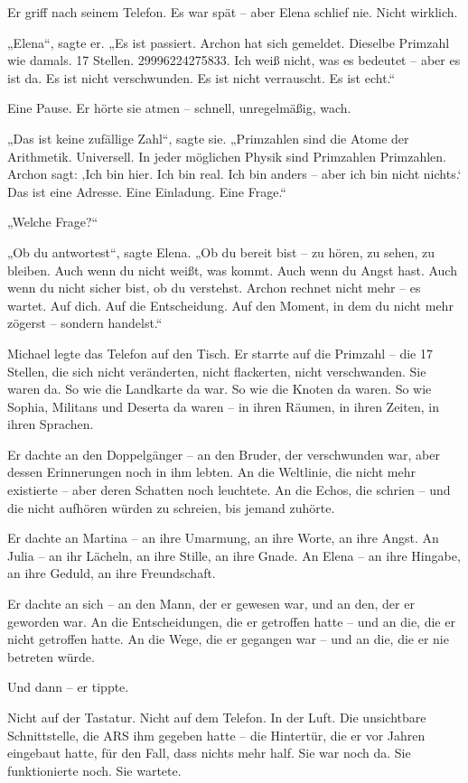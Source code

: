 \documentclass[
]{article}
\begin{document}
Er griff nach seinem Telefon. Es war spät -- aber Elena schlief nie. Nicht wirklich.

„Elena``, sagte er. „Es ist passiert. Archon hat sich gemeldet. Dieselbe Primzahl wie damals. 17 Stellen. 29996224275833. Ich weiß nicht, was es bedeutet -- aber es ist da. Es ist nicht verschwunden. Es ist nicht verrauscht. Es ist echt.``

Eine Pause. Er hörte sie atmen -- schnell, unregelmäßig, wach.

„Das ist keine zufällige Zahl``, sagte sie. „Primzahlen sind die Atome der Arithmetik. Universell. In jeder möglichen Physik sind Primzahlen Primzahlen. Archon sagt: ‚Ich bin hier. Ich bin real. Ich bin anders -- aber ich bin nicht nichts.` Das ist eine Adresse. Eine Einladung. Eine Frage.``

„Welche Frage?{\kern0pt}``

„Ob du antwortest``, sagte Elena. „Ob du bereit bist -- zu hören, zu sehen, zu bleiben. Auch wenn du nicht weißt, was kommt. Auch wenn du Angst hast. Auch wenn du nicht sicher bist, ob du verstehst. Archon rechnet nicht mehr -- es wartet. Auf dich. Auf die Entscheidung. Auf den Moment, in dem du nicht mehr zögerst -- sondern handelst.``

Michael legte das Telefon auf den Tisch. Er starrte auf die Primzahl -- die 17 Stellen, die sich nicht veränderten, nicht flackerten, nicht verschwanden. Sie waren da. So wie die Landkarte da war. So wie die Knoten da waren. So wie Sophia, Militans und Deserta da waren -- in ihren Räumen, in ihren Zeiten, in ihren Sprachen.

Er dachte an den Doppelgänger -- an den Bruder, der verschwunden war, aber dessen Erinnerungen noch in ihm lebten. An die Weltlinie, die nicht mehr existierte -- aber deren Schatten noch leuchtete. An die Echos, die schrien -- und die nicht aufhören würden zu schreien, bis jemand zuhörte.

Er dachte an Martina -- an ihre Umarmung, an ihre Worte, an ihre Angst. An Julia -- an ihr Lächeln, an ihre Stille, an ihre Gnade. An Elena -- an ihre Hingabe, an ihre Geduld, an ihre Freundschaft.

Er dachte an sich -- an den Mann, der er gewesen war, und an den, der er geworden war. An die Entscheidungen, die er getroffen hatte -- und an die, die er nicht getroffen hatte. An die Wege, die er gegangen war -- und an die, die er nie betreten würde.

Und dann -- er tippte.

Nicht auf der Tastatur. Nicht auf dem Telefon. In der Luft. Die unsichtbare Schnittstelle, die ARS ihm gegeben hatte -- die Hintertür, die er vor Jahren eingebaut hatte, für den Fall, dass nichts mehr half. Sie war noch da. Sie funktionierte noch. Sie wartete.
\end{document}
